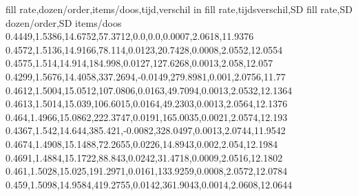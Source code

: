 fill rate,dozen/order,items/doos,tijd,verschil in fill rate,tijdsverschil,SD fill rate,SD dozen/order,SD items/doos
0.4449,1.5386,14.6752,57.3712,0.0,0.0,0.0007,2.0618,11.9376
0.4572,1.5136,14.9166,78.114,0.0123,20.7428,0.0008,2.0552,12.0554
0.4575,1.514,14.914,184.998,0.0127,127.6268,0.0013,2.058,12.057
0.4299,1.5676,14.4058,337.2694,-0.0149,279.8981,0.001,2.0756,11.77
0.4612,1.5004,15.0512,107.0806,0.0163,49.7094,0.0013,2.0532,12.1364
0.4613,1.5014,15.039,106.6015,0.0164,49.2303,0.0013,2.0564,12.1376
0.464,1.4966,15.0862,222.3747,0.0191,165.0035,0.0021,2.0574,12.193
0.4367,1.542,14.644,385.421,-0.0082,328.0497,0.0013,2.0744,11.9542
0.4674,1.4908,15.1488,72.2655,0.0226,14.8943,0.002,2.054,12.1984
0.4691,1.4884,15.1722,88.843,0.0242,31.4718,0.0009,2.0516,12.1802
0.461,1.5028,15.025,191.2971,0.0161,133.9259,0.0008,2.0572,12.0784
0.459,1.5098,14.9584,419.2755,0.0142,361.9043,0.0014,2.0608,12.0644
